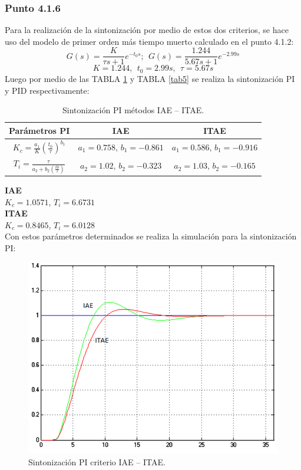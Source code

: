 \documentclass[twocolumn]{IEEEtran}
\begin{document}
\subsubsection{Punto 4.1.6}
\noindent
Para la realización de la sintonización por medio de estos dos criterios, se hace uso del modelo de primer orden más tiempo muerto calculado en el punto 4.1.2:
\begin{equation}
 G\left( s \right) = \frac{K}{{\tau s + 1}}e^{ - t_0 s};\ \ G\left( s \right) = \frac{{1.244}}{{5.67s + 1}}e^{ - 2.99s} 
\label{ecu120}
\end{equation}
\begin{equation}
 K=1.244,\ \ t_0 = 2.99s,\ \ \tau=5.67s
\label{ecu121}
\end{equation}
\noindent
Luego por medio de las TABLA \ref{tab4} y TABLA \ref{tab5} se realiza la sintonización PI y PID respectivamente:
\begin{table}[H]
	\centering
\begin{tabular}{|c|c|c|}\hline
\textbf{Parámetros PI} & \textbf{IAE} & \textbf{ITAE} \\ \hline
$K_c=\frac{{a_1 }}{K}\left( {\frac{{t_0 }}{\tau }} \right)^{b_1 }$ & $a_1=0.758$, $b_1=-0.861$ & $a_1=0.586$, $b_1=-0.916$ \\ \hline
$T_i  = \frac{\tau }{{a_2  + b_2 \left( {\frac{{t0}}{\tau }} \right)}}$ & $a_2=1.02$, $b_2=-0.323$ & $a_2=1.03$, $b_2=-0.165$ \\ \hline
    \end{tabular}
	\caption{Sintonización PI métodos IAE – ITAE.}
	\label{tab4}
\end{table}
\noindent
\textbf{IAE}\\
$K_c=1.0571$, $T_i=6.6731$\\
\textbf{ITAE}\\
$K_c=0.8465$, $T_i=6.0128$\\
Con estos parámetros determinados se realiza la simulación para la sintonización PI:
\begin{figure}[H]
	\centering
		\includegraphics[scale=0.28]{1.png}
	\caption{Sintonización PI criterio IAE – ITAE.}
	\label{fig001}
\end{figure}
\end{document}

